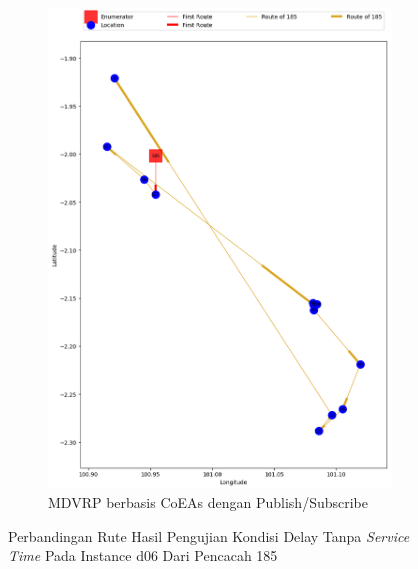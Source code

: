 \begin{figure}[H]\ContinuedFloat
	\centering
	\begin{subfigure}[t]{\textwidth}
		\centering
		\includegraphics[width=\textwidth]{Resources/Images/delayed_6/real_m15_n100_delayed_6_185_pubsub_coes}
		\caption{MDVRP berbasis CoEAs dengan Publish/Subscribe}
		\label{fig:real_m15_n100_delayed_6_185_pubsub_coes}
	\end{subfigure}
	\caption{Perbandingan Rute Hasil Pengujian Kondisi Delay Tanpa \textit{Service Time} Pada Instance d06 Dari Pencacah 185}
	\label{fig:real_m15_n100_delayed_6_185_contd}
\end{figure}



